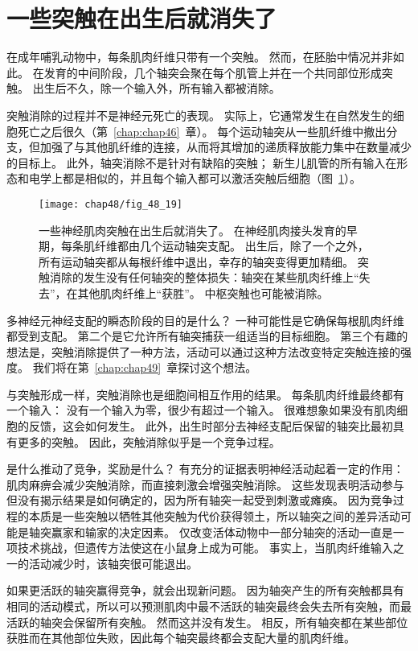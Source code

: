 \section{一些突触在出生后就消失了}

在成年哺乳动物中，每条肌肉纤维只带有一个突触。
然而，在胚胎中情况并非如此。
在发育的中间阶段，几个轴突会聚在每个肌管上并在一个共同部位形成突触。
出生后不久，除一个输入外，所有输入都被消除。


突触消除的过程并不是神经元死亡的表现。 实际上，它通常发生在自然发生的细胞死亡之后很久（第~\ref{chap:chap46}~章）。
每个运动轴突从一些肌纤维中撤出分支，但加强了与其他肌纤维的连接，从而将其增加的递质释放能力集中在数量减少的目标上。
此外，轴突消除不是针对有缺陷的突触；
新生儿肌管的所有输入在形态和电学上都是相似的，并且每个输入都可以激活突触后细胞（图~\ref{fig:48_19}）。


\begin{figure}[htbp]
	\centering
	\texttt{[image: chap48/fig\_48\_19]}
	\caption{一些神经肌肉突触在出生后就消失了。
		在神经肌肉接头发育的早期，每条肌纤维都由几个运动轴突支配。
		出生后，除了一个之外，所有运动轴突都从每根纤维中退出，幸存的轴突变得更加精细。
		突触消除的发生没有任何轴突的整体损失：轴突在某些肌肉纤维上“失去”，在其他肌肉纤维上“获胜”。
		中枢突触也可能被消除。}
	\label{fig:48_19}
\end{figure}


多神经元神经支配的瞬态阶段的目的是什么？
一种可能性是它确保每根肌肉纤维都受到支配。
第二个是它允许所有轴突捕获一组适当的目标细胞。
第三个有趣的想法是，突触消除提供了一种方法，活动可以通过这种方法改变特定突触连接的强度。
我们将在第~\ref{chap:chap49}~章探讨这个想法。


与突触形成一样，突触消除也是细胞间相互作用的结果。
每条肌肉纤维最终都有一个输入：
没有一个输入为零，很少有超过一个输入。
很难想象如果没有肌肉细胞的反馈，这会如何发生。
此外，出生时部分去神经支配后保留的轴突比最初具有更多的突触。
因此，突触消除似乎是一个竞争过程。


是什么推动了竞争，奖励是什么？
有充分的证据表明神经活动起着一定的作用：
肌肉麻痹会减少突触消除，而直接刺激会增强突触消除。
这些发现表明活动参与但没有揭示结果是如何确定的，因为所有轴突一起受到刺激或瘫痪。
因为竞争过程的本质是一些突触以牺牲其他突触为代价获得领土，所以轴突之间的差异活动可能是轴突赢家和输家的决定因素。
仅改变活体动物中一部分轴突的活动一直是一项技术挑战，但遗传方法使这在小鼠身上成为可能。
事实上，当肌肉纤维输入之一的活动减少时，该轴突很可能退出。


如果更活跃的轴突赢得竞争，就会出现新问题。
因为轴突产生的所有突触都具有相同的活动模式，所以可以预测肌肉中最不活跃的轴突最终会失去所有突触，而最活跃的轴突会保留所有突触。
然而这并没有发生。
相反，所有轴突都在某些部位获胜而在其他部位失败，因此每个轴突最终都会支配大量的肌肉纤维。



